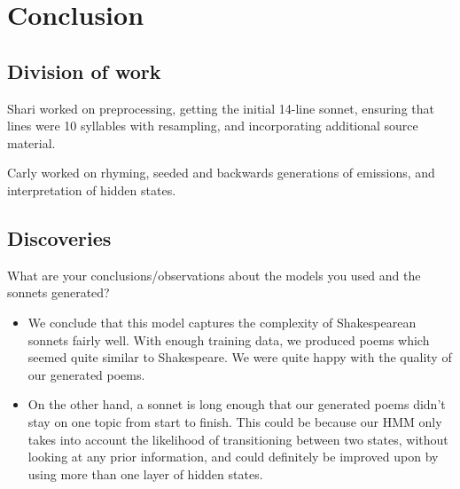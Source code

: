 \newpage

\section{Conclusion}
\subsection{Division of work}
Shari worked on preprocessing, getting the initial 14-line sonnet, ensuring that lines were 10 syllables with resampling, and incorporating additional source material.

Carly worked on rhyming, seeded and backwards generations of emissions, and interpretation of hidden states.

\subsection{Discoveries}
What are your conclusions/observations about the models you used and the sonnets generated?
\begin{itemize}
	\item We conclude that this model captures the complexity of Shakespearean sonnets fairly well.  With enough training data, we produced poems which seemed quite similar to Shakespeare.  We were quite happy with the quality of our generated poems.  
	\item On the other hand, a sonnet is long enough that our generated poems didn't stay on one topic from start to finish.  This could be because our HMM only takes into account the likelihood of transitioning between two states, without looking at any prior information, and could definitely be improved upon by using more than one layer of hidden states.
\end{itemize}

